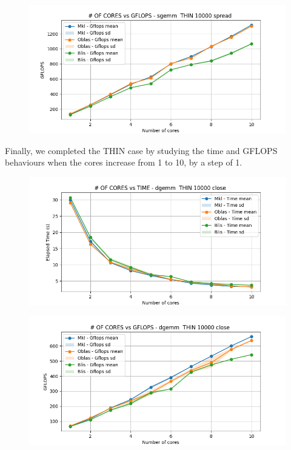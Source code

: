 \documentclass[12pt, titlepage]{report}
\begin{document}
\begin{figure}[H]
    \centering
    \includegraphics[width=\textwidth]{THIN scalability deep/sgemm__THIN_10000_spread_gflops.png}
\end{figure}

Finally, we completed the THIN case by studying the time and GFLOPS behaviours when the cores increase from 1 to 10, by a step of 1.
\begin{figure}[H]
    \centering
    \includegraphics[width=\textwidth]{THIN scalability deep/dgemm__THIN_10000_close_time.png}
\end{figure}

\begin{figure}[H]
    \centering
    \includegraphics[width=\textwidth]{THIN scalability deep/dgemm__THIN_10000_close_gflops.png}
\end{figure}
\end{document}
